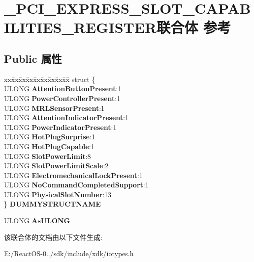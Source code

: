 \hypertarget{union___p_c_i___e_x_p_r_e_s_s___s_l_o_t___c_a_p_a_b_i_l_i_t_i_e_s___r_e_g_i_s_t_e_r}{}\section{\+\_\+\+P\+C\+I\+\_\+\+E\+X\+P\+R\+E\+S\+S\+\_\+\+S\+L\+O\+T\+\_\+\+C\+A\+P\+A\+B\+I\+L\+I\+T\+I\+E\+S\+\_\+\+R\+E\+G\+I\+S\+T\+E\+R联合体 参考}
\label{union___p_c_i___e_x_p_r_e_s_s___s_l_o_t___c_a_p_a_b_i_l_i_t_i_e_s___r_e_g_i_s_t_e_r}
\subsection*{Public 属性}
\begin{DoxyCompactItemize}
\item 
\mbox{\label{union___p_c_i___e_x_p_r_e_s_s___s_l_o_t___c_a_p_a_b_i_l_i_t_i_e_s___r_e_g_i_s_t_e_r_a91954e2e7fd977b1e23aa94ba96f6e6d}} 
\begin{tabbing}
xx\=xx\=xx\=xx\=xx\=xx\=xx\=xx\=xx\=\kill
struct \{\\
\>ULONG {\bfseries AttentionButtonPresent}:1\\
\>ULONG {\bfseries PowerControllerPresent}:1\\
\>ULONG {\bfseries MRLSensorPresent}:1\\
\>ULONG {\bfseries AttentionIndicatorPresent}:1\\
\>ULONG {\bfseries PowerIndicatorPresent}:1\\
\>ULONG {\bfseries HotPlugSurprise}:1\\
\>ULONG {\bfseries HotPlugCapable}:1\\
\>ULONG {\bfseries SlotPowerLimit}:8\\
\>ULONG {\bfseries SlotPowerLimitScale}:2\\
\>ULONG {\bfseries ElectromechanicalLockPresent}:1\\
\>ULONG {\bfseries NoCommandCompletedSupport}:1\\
\>ULONG {\bfseries PhysicalSlotNumber}:13\\
\} {\bfseries DUMMYSTRUCTNAME}\\

\end{tabbing}\item 
\mbox{\label{union___p_c_i___e_x_p_r_e_s_s___s_l_o_t___c_a_p_a_b_i_l_i_t_i_e_s___r_e_g_i_s_t_e_r_af31bf8e7753d7d5aadc693bf88d50b28}} 
U\+L\+O\+NG {\bfseries As\+U\+L\+O\+NG}
\end{DoxyCompactItemize}


该联合体的文档由以下文件生成\+:\begin{DoxyCompactItemize}
\item 
E\+:/\+React\+O\+S-\/0../sdk/include/xdk/iotypes.\+h\end{DoxyCompactItemize}
